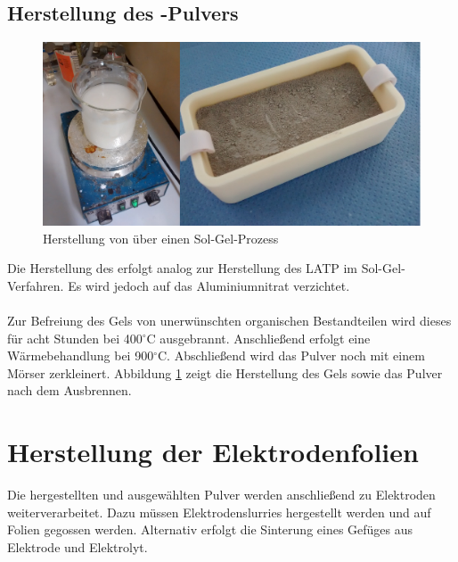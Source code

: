 \documentclass[a4paper, 11pt, headsepline,footsepline,twoside,abstract]{scrbook}
\begin{document}
\subsection{Herstellung des -Pulvers}
\label{praep_LiTiPO5}
\begin{figure}
	\centering
	\includegraphics[width=1.0\columnwidth]{images/SolGel.jpg}
	\caption{Herstellung von  über einen Sol-Gel-Prozess}
	\label{sol_gel}
\end{figure}
Die Herstellung des  erfolgt analog zur Herstellung des LATP im Sol-Gel-Verfahren. Es wird jedoch auf das Aluminiumnitrat verzichtet.
\\\\
Zur Befreiung des Gels von unerwünschten organischen Bestandteilen wird dieses für acht Stunden bei 400$^\circ$C ausgebrannt. Anschließend erfolgt eine Wärmebehandlung bei 900$^\circ$C. Abschließend wird das Pulver noch mit einem Mörser zerkleinert. Abbildung \ref{sol_gel} zeigt die Herstellung des Gels sowie das Pulver nach dem Ausbrennen.
\section{Herstellung der Elektrodenfolien}
Die hergestellten und ausgewählten Pulver werden anschließend zu Elektroden weiterverarbeitet. Dazu müssen Elektrodenslurries hergestellt werden und auf Folien gegossen werden. Alternativ erfolgt die Sinterung eines Gefüges aus Elektrode und Elektrolyt.
\end{document}
